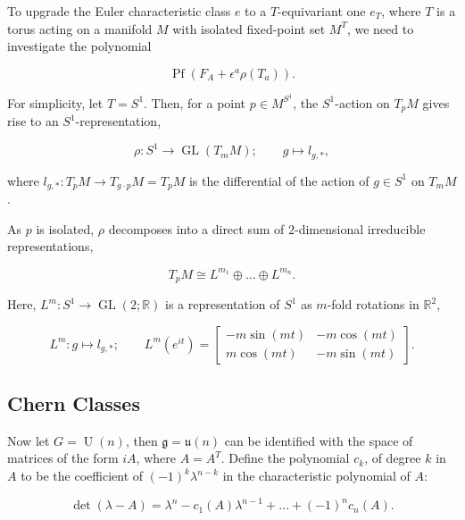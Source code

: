 \documentclass{article}
\newcommand{\ra}{\rightarrow}
\newcommand{\lra}{\longrightarrow}
\newcommand{\e}{\epsilon}
\newcommand{\RR}{\mathbb{R}}
\newcommand{\mfg}{\mathfrak{g}}
\newcommand{\mf}[1]{\mathfrak{#1}}
\DeclareMathOperator{\Pf}{Pf}
\DeclareMathOperator{\GL}{GL}
\DeclareMathOperator{\UU}{U}
\begin{document}
To upgrade the Euler characteristic class $e$ to a $T$-equivariant one $e_{T}$, where $T$ is a torus acting on a manifold $M$ with isolated fixed-point set $M^{T}$, we need to investigate the polynomial

\begin{equation*}
	\Pf(F_{A} + \e^{a}\rho(T_{a})).
\end{equation*}

For simplicity, let $T = S^{1}$. Then, for a point $p \in M^{S^{1}}$, the $S^{1}$-action on $T_{p}M$ gives rise to an $S^{1}$-representation,

\begin{equation*}
	\rho : S^{1} \lra \GL(T_{m}M); \qquad g \longmapsto l_{g, \ast},
\end{equation*}

where $l_{g, \ast} : T_{p}M \ra T_{g\cdot p}M = T_{p}M$ is the differential of the action of $g \in S^{1}$ on $T_{m}M$.

As $p$ is isolated, $\rho$ decomposes into a direct sum of $2$-dimensional irreducible representations,

\begin{equation*}
	T_{p}M \cong L^{m_{1}} \oplus \ldots \oplus L^{m_{n}}.
\end{equation*}

Here, $L^{m} : S^{1} \ra \GL(2;\RR)$ is a representation of $S^{1}$ as $m$-fold rotations in $\RR^{2}$,

\begin{equation*}
	L^{m} : g \longmapsto l_{g,\ast}; \qquad
	L^{m}(e^{it}) =
	\begin{bmatrix}
		-m\sin(mt) & -m\cos(mt) \\
		m\cos(mt) & -m\sin(mt)
	\end{bmatrix}.
\end{equation*}

\subsection{Chern Classes}

Now let $G = \UU(n)$, then $\mfg = \mf{u}(n)$ can be identified with the space of matrices of the form $iA$, where $A = A^{T}$. Define the polynomial $c_{k}$, of degree $k$ in $A$ to be the coefficient of $(-1)^{k}\lambda^{n-k}$ in the characteristic polynomial of $A$:

\begin{equation*}
	\det(\lambda - A) = \lambda^{n} - c_{1}(A)\lambda^{n-1} + \ldots + (-1)^{n}c_{n}(A).
\end{equation*}
\end{document}
